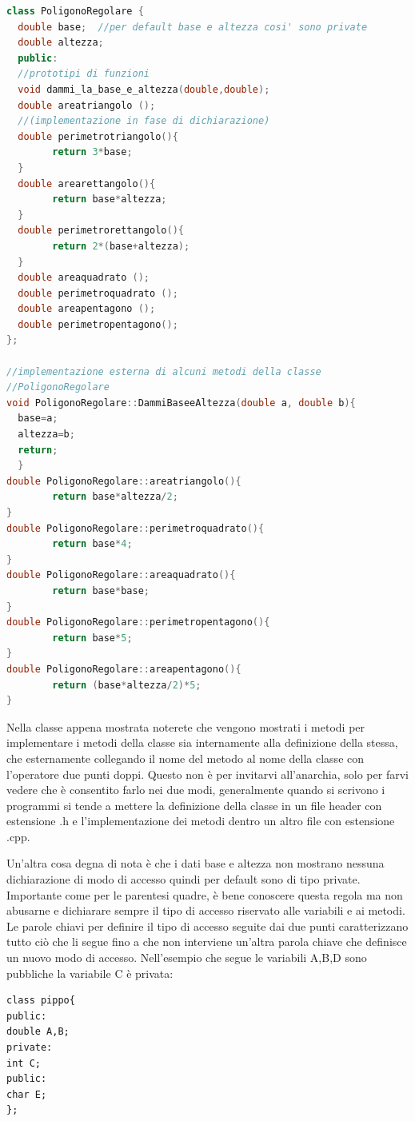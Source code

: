 \documentclass[11pt,fleqn]{book} %
\begin{document}
\begin{lstlisting}[language=c++]
class PoligonoRegolare {
  double base;  //per default base e altezza cosi' sono private
  double altezza;
  public:
  //prototipi di funzioni
  void dammi_la_base_e_altezza(double,double);
  double areatriangolo ();
  //(implementazione in fase di dichiarazione)
  double perimetrotriangolo(){
        return 3*base;
  }
  double arearettangolo(){
        return base*altezza;
  }
  double perimetrorettangolo(){
        return 2*(base+altezza);   
  }
  double areaquadrato ();
  double perimetroquadrato ();
  double areapentagono ();
  double perimetropentagono();
};

//implementazione esterna di alcuni metodi della classe
//PoligonoRegolare
void PoligonoRegolare::DammiBaseeAltezza(double a, double b){
  base=a;
  altezza=b;
  return;
  }
double PoligonoRegolare::areatriangolo(){
        return base*altezza/2;
}
double PoligonoRegolare::perimetroquadrato(){
        return base*4;
}
double PoligonoRegolare::areaquadrato(){
        return base*base;
}
double PoligonoRegolare::perimetropentagono(){
        return base*5;
}
double PoligonoRegolare::areapentagono(){
        return (base*altezza/2)*5;
}
 \end{lstlisting}
 
 Nella classe appena mostrata noterete che vengono mostrati i metodi per implementare i metodi della classe sia internamente alla definizione della stessa, che esternamente collegando il nome del metodo al nome della classe con l'operatore due punti doppi. Questo non è per invitarvi all'anarchia, solo per farvi vedere che è consentito farlo nei due modi, generalmente quando si scrivono i programmi si tende a mettere la definizione della classe in un file header con estensione .h e l'implementazione dei metodi dentro un altro file con estensione .cpp.
 
 Un'altra cosa degna di nota è che i dati base e altezza non mostrano nessuna dichiarazione di modo di accesso quindi per default sono di tipo private. Importante come per le parentesi quadre, è bene conoscere questa regola ma non abusarne e dichiarare sempre il tipo di accesso riservato alle variabili e ai metodi. Le parole chiavi per definire il tipo di accesso seguite dai due punti caratterizzano tutto ciò che li segue fino a che non interviene un'altra parola chiave che definisce un nuovo modo di accesso.
Nell'esempio che segue le variabili A,B,D sono pubbliche la variabile C è privata:
\begin{verbatim}
class pippo{
public:
double A,B;
private:
int C;
public:
char E;
};
\end{verbatim} 
\end{document}
